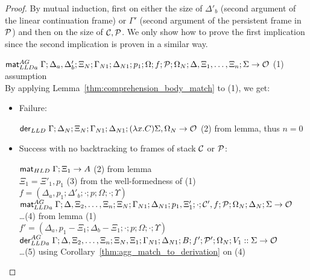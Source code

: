 \begin{proof}
By mutual induction, first on either the size of $\Delta'_b$ (second argument of
the linear continuation frame) or $\Gamma'$ (second argument of the
persistent frame in $\mathcal{P}$) and then on the size of $\mathcal{C},
\mathcal{P}$.  We only show how to prove the first implication since the
second implication is proven in a similar way.

$\mathsf{mat}_{LLDa}^{AG} \; \Gamma; \Delta_a, \Delta'_b; \Xi_N; \Gamma_{N1}; \Delta_{N1}; p_1;
\Omega; f; \mathcal{P}; \Omega_N; \Delta, \Xi_1, \dotsc, \Xi_n; \Sigma \rightarrow \mathcal{O}$ \hfill (1) assumption\\

By applying Lemma~\ref{thm:comprehension_body_match} to (1), we get:

\begin{itemize}[leftmargin=*]
   \item Failure:
   
   $\mathsf{der}_{LLD} \; \Gamma; \Delta_N; \Xi_N; \Gamma_{N1}; \Delta_{N1}; (\lambda x.
         C)\Sigma, \Omega_N
      \rightarrow \mathcal{O}$ \hfill (2) from lemma, thus $n = 0$\\
   
   \item Success with no backtracking to frames of stack $\mathcal{C}$ or
   $\mathcal{P}$:
   
      $\mathsf{mat}_{HLD} \; \Gamma; \Xi_1 \rightarrow A$ \hfill (2) from lemma \\

      $\Xi_1 = \Xi'_1, p_1$ \hfill (3) from the well-formedness of (1) \\
      $f = (\Delta_a, p_1; \Delta'_b; \cdot; p; \Omega; \cdot; \Upsilon)$ \\

      $\mathsf{mat}_{LLDa}^{AG} \; \Gamma; \Delta, \Xi_2, \dotsc, \Xi_n; \Xi_N; \Gamma_{N1};
            \Delta_{N1}; p_1, \Xi'_1; \cdot; \mathcal{C'}, f; \mathcal{P};
            \Omega_N; \Delta_N; \Sigma \rightarrow \mathcal{O}$ \\
      \dots \hfill (4) from lemma (1) \\

      $f' = (\Delta_a, p_1 - \Xi_1; \Delta_b - \Xi_1; \cdot; p; \Omega; \cdot;
            \Upsilon)$ \\

      $\mathsf{der}_{LLDa}^{AG} \; \Gamma; \Delta, \Xi_2, \dotsc, \Xi_n; \Xi_N, \Xi_1; \Gamma_{N1}; \Delta_{N1}; B; f';
      \mathcal{P'}; \Omega_N; V_1 :: \Sigma \rightarrow \mathcal{O}$ \\
      \dots \hfill (5) using Corollary~\ref{thm:agg_match_to_derivation} on (4) \\


\end{itemize}
\end{proof}

